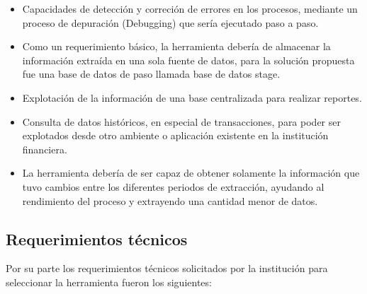 \documentclass[a4paper,openright,12pt]{book}
\begin{document}
\begin{itemize}
\item Capacidades de detección y correción de errores en los procesos, mediante
  un proceso de depuración (Debugging) que sería ejecutado paso a paso.

\item Como un requerimiento básico, la herramienta debería de almacenar la
  información extraída en una sola fuente de datos, para la solución propuesta
  fue una base de datos de paso llamada base de datos stage.

\item Explotación de la información de una base centralizada para realizar
  reportes.

\item Consulta de datos históricos, en especial de transacciones, para poder ser
  explotados desde otro ambiente o aplicación existente en la institución
  financiera.

\item La herramienta debería de ser capaz de obtener solamente la información
  que tuvo cambios entre los diferentes periodos de extracción, ayudando al
  rendimiento del proceso y extrayendo una cantidad menor de datos.
\end{itemize}

\subsection{Requerimientos técnicos}

Por su parte los requerimientos técnicos solicitados por la institución para
seleccionar la herramienta fueron los siguientes:
\end{document}
